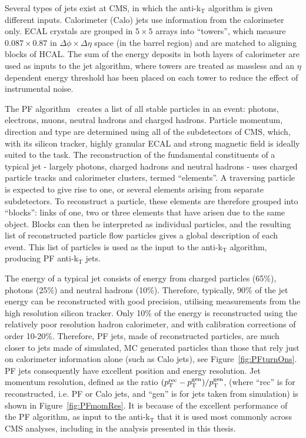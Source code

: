 Several types of jets exist at \ac{CMS}, in which the anti-k$_{\mathrm{T}}$ algorithm is given different inputs.
Calorimeter (Calo) jets use information from the calorimeter only.
\ac{ECAL} crystals are grouped in $5\times5$ arrays into ``towers'', which measure $0.087\times0.87$ in $\Delta\phi \times \Delta \eta$ space (in the barrel region) and are matched to aligning blocks of \ac{HCAL}.
The sum of the energy deposits in both layers of calorimeter are used as inputs to the jet algorithm, where towers are treated as massless and an $\eta$ dependent energy threshold has been placed on each tower to reduce the effect of instrumental noise. 

The \ac{PF} algorithm~\cite{PFT-09-001} creates a list of all stable particles in an event: photons, electrons, muons, neutral hadrons and charged hadrons.
Particle momentum, direction and type are determined using all of the subdetectors of \ac{CMS}, 
which, with its silicon tracker, highly granular \ac{ECAL} and strong magnetic field is ideally suited to the task.
The reconstruction of the fundamental constituents of a typical jet - largely photons, charged hadrons and neutral hadrons - uses charged particle tracks and calorimeter clusters, termed ``elements''.
A traversing particle is expected to give rise to one, or several elements arising from separate subdetectors. 
To reconstruct a particle, these elements are therefore grouped into ``blocks'': links of one, two or three elements
that have arisen due to the same object.
Blocks can then be interpreted as individual particles, and the resulting list of reconstructed particle flow particles 
gives a global description of each event.
This list of particles is used as the input to the anti-k$_{\mathrm{T}}$ algorithm, producing \ac{PF} anti-k$_{\mathrm{T}}$ jets.

The energy of a typical jet consists of energy from charged particles (65\%), photons (25\%) and neutral hadrons (10\%).
Therefore, typically, 90\% of the jet energy can be reconstructed with good precision, utilising measurements from the high resolution silicon tracker. 
Only 10\% of the energy is reconstructed using the relatively poor resolution hadron calorimeter, and with calibration corrections of order 10-20\%. 
Therefore, \ac{PF} jets, made of reconstructed particles, are much closer to jets made of simulated, \ac{MC} generated particles than those that rely just on calorimeter information alone (such as Calo jets), see Figure~\ref{fig:PFturnOns}.
\ac{PF} jets consequently have excellent position and energy resolution. 
Jet momentum resolution, defined as the ratio $(p_{\text{T}}^{\mathrm{rec}} - p_{\text{T}}^{\mathrm{gen}})/p_{\text{T}}^{\mathrm{gen}}$, (where ``rec'' is for reconstructed, i.e. \ac{PF} or Calo jets, and ``gen'' is for jets taken from simulation) 
is shown in Figure~\ref{fig:PFmomRes}.
It is because of the excellent performance of the \ac{PF} algorithm, as input to the anti-k$_{\mathrm{T}}$ that it is used most commonly across \ac{CMS} analyses, including in the analysis presented in this thesis.

